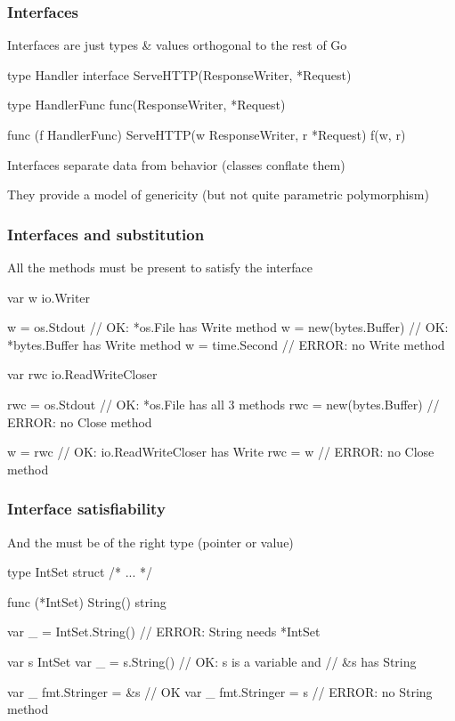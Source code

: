 \documentclass[handout,compress,t,11pt]{beamer}
\begin{document}
\begin{frame}[fragile]
    \frametitle{Interfaces}
    Interfaces are just types \& values orthogonal to the rest of Go
\begin{golang}
type Handler interface {
	ServeHTTP(ResponseWriter, *Request)
}

type HandlerFunc func(ResponseWriter, *Request)

func (f HandlerFunc) ServeHTTP(w ResponseWriter, r *Request) {
    f(w, r)
}
\end{golang}
\vspace{\baselineskip}
    Interfaces separate data from behavior (classes conflate them) \par
\vspace{\baselineskip}
    They provide a model of genericity (but not quite parametric polymorphism)    
\end{frame}

\begin{frame}[fragile]
    \frametitle{Interfaces and substitution}
    All the methods must be present to satisfy the interface \par
\begin{golang}
var w io.Writer

w = os.Stdout           // OK: *os.File has Write method
w = new(bytes.Buffer)   // OK: *bytes.Buffer has Write method
w = time.Second         // ERROR: no Write method

var rwc io.ReadWriteCloser

rwc = os.Stdout         // OK: *os.File has all 3 methods
rwc = new(bytes.Buffer) // ERROR: no Close method

w = rwc                 // OK: io.ReadWriteCloser has Write
rwc = w                 // ERROR: no Close method
\end{golang}
\end{frame}

\begin{frame}[fragile]
    \frametitle{Interface satisfiability}
    And the must be of the right type (pointer or value) \par
\begin{golang}
type IntSet struct { /* ... */ }

func (*IntSet) String() string

var _ = IntSet{}.String() // ERROR: String needs *IntSet

var s IntSet
var _ = s.String()        // OK: s is a variable and
                          // &s has String

var _ fmt.Stringer = &s   // OK
var _ fmt.Stringer = s    // ERROR: no String method
\end{golang}
\end{frame}
\end{document}
